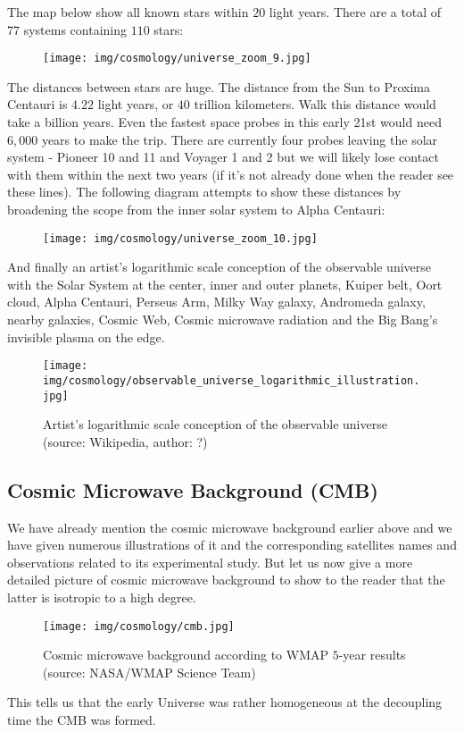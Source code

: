 \begin{enumerate}
		The map below show all known stars within $20$ light years. There are a total of $77$ systems containing $110$ stars:
		\begin{figure}[H]
			\centering
			\texttt{[image: img/cosmology/universe\_zoom\_9.jpg]}
		\end{figure}
		The distances between stars are huge. The distance from the Sun to Proxima Centauri is $4.22$ light years, or $40$ trillion kilometers. Walk this distance would take a billion years. Even the fastest space probes in this early 21st would need $6,000$ years to make the trip. There are currently four probes leaving the solar system - Pioneer 10 and 11 and Voyager 1 and 2 but we will likely lose contact with them within the next two years (if it's not already done when the reader see these lines). The following diagram attempts to show these distances by broadening the scope from the inner solar system to Alpha Centauri:
	\begin{figure}[H]
		\centering
		\texttt{[image: img/cosmology/universe\_zoom\_10.jpg]}
		\end{figure}
	\end{enumerate}
	And finally an artist's logarithmic scale conception of the observable universe with the Solar System at the center, inner and outer planets, Kuiper belt, Oort cloud, Alpha Centauri, Perseus Arm, Milky Way galaxy, Andromeda galaxy, nearby galaxies, Cosmic Web, Cosmic microwave radiation and the Big Bang's invisible plasma on the edge.
	\begin{figure}[H]
		\centering
		\texttt{[image: img/cosmology/observable\_universe\_logarithmic\_illustration.jpg]}
		\caption[Artist's logarithmic scale conception of the observable universe]{Artist's logarithmic scale conception of the observable universe (source: Wikipedia, author: ?)}
	\end{figure}
	
	\pagebreak
	\subsection{Cosmic Microwave Background (CMB)}\label{cosmic microwave background}
	We have already mention the cosmic microwave background earlier above and we have given numerous illustrations of it and the corresponding satellites names and observations related to its experimental study. But let us now give a more detailed picture of cosmic microwave background to show to the reader that the latter is isotropic to a high degree. 
	\begin{figure}[H]
		\centering
		\texttt{[image: img/cosmology/cmb.jpg]}
		\caption[Cosmic microwave background according to WMAP $5$-year results]{Cosmic microwave background according to WMAP $5$-year results (source: NASA/WMAP Science Team)}
	\end{figure}
	This tells us that the early Universe was rather homogeneous at the decoupling time the CMB was formed.
	
